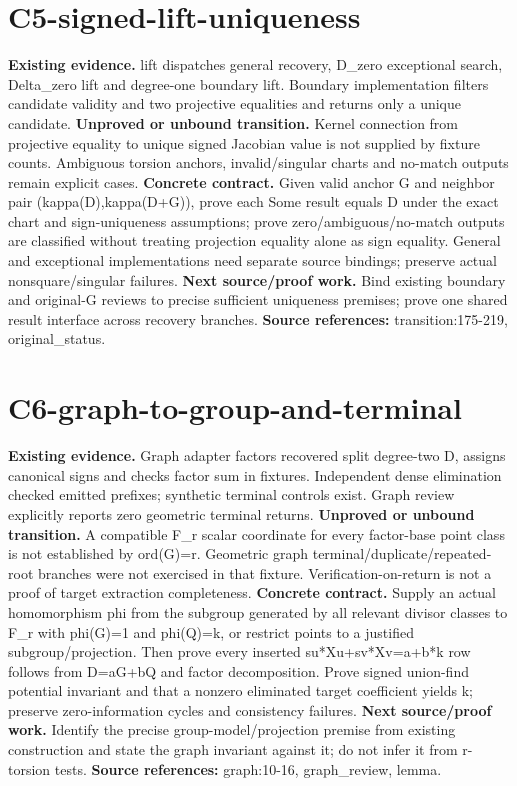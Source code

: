 \documentclass[10pt]{article}
\begin{document}
\section*{C5-signed-lift-uniqueness}
\textbf{Existing evidence.} lift dispatches general recovery, D\_zero exceptional search, Delta\_zero lift and degree-one boundary lift. Boundary implementation filters candidate validity and two projective equalities and returns only a unique candidate.
\textbf{Unproved or unbound transition.} Kernel connection from projective equality to unique signed Jacobian value is not supplied by fixture counts. Ambiguous torsion anchors, invalid/singular charts and no-match outputs remain explicit cases.
\textbf{Concrete contract.} Given valid anchor G and neighbor pair (kappa(D),kappa(D+G)), prove each Some result equals D under the exact chart and sign-uniqueness assumptions; prove zero/ambiguous/no-match outputs are classified without treating projection equality alone as sign equality. General and exceptional implementations need separate source bindings; preserve actual nonsquare/singular failures.
\textbf{Next source/proof work.} Bind existing boundary and original-G reviews to precise sufficient uniqueness premises; prove one shared result interface across recovery branches.
\textbf{Source references:} transition:175-219, original\_status.
\section*{C6-graph-to-group-and-terminal}
\textbf{Existing evidence.} Graph adapter factors recovered split degree-two D, assigns canonical signs and checks factor sum in fixtures. Independent dense elimination checked emitted prefixes; synthetic terminal controls exist. Graph review explicitly reports zero geometric terminal returns.
\textbf{Unproved or unbound transition.} A compatible F\_r scalar coordinate for every factor-base point class is not established by ord(G)=r. Geometric graph terminal/duplicate/repeated-root branches were not exercised in that fixture. Verification-on-return is not a proof of target extraction completeness.
\textbf{Concrete contract.} Supply an actual homomorphism phi from the subgroup generated by all relevant divisor classes to F\_r with phi(G)=1 and phi(Q)=k, or restrict points to a justified subgroup/projection. Then prove every inserted su*Xu+sv*Xv=a+b*k row follows from D=aG+bQ and factor decomposition. Prove signed union-find potential invariant and that a nonzero eliminated target coefficient yields k; preserve zero-information cycles and consistency failures.
\textbf{Next source/proof work.} Identify the precise group-model/projection premise from existing construction and state the graph invariant against it; do not infer it from r-torsion tests.
\textbf{Source references:} graph:10-16, graph\_review, lemma.
\newpage
\end{document}
